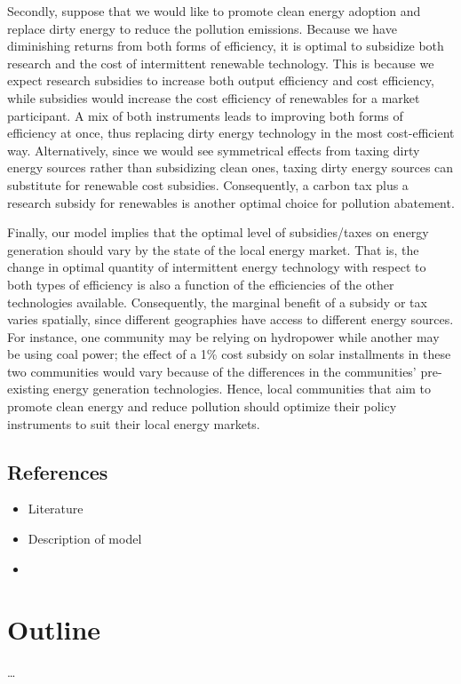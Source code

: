 \documentclass[11pt,a4paper]{extarticle}
\begin{document}
Secondly, suppose that we would like to promote clean energy adoption and replace dirty energy to reduce the pollution emissions. Because we have diminishing returns from both forms of efficiency, it is optimal to subsidize both research and the cost of intermittent renewable technology. This is because we expect research subsidies to increase both output efficiency and cost efficiency, while subsidies would increase the cost efficiency of renewables for a market participant. A mix of both instruments leads to improving both forms of efficiency at once, thus replacing dirty energy technology in the most cost-efficient way. Alternatively, since we would see symmetrical effects from taxing dirty energy sources rather than subsidizing clean ones, taxing dirty energy sources can substitute for renewable cost subsidies. Consequently, a carbon tax plus a research subsidy for renewables is another optimal choice for pollution abatement. 

Finally, our model implies that the optimal level of subsidies/taxes on energy generation should vary by the state of the local energy market. That is, the change in optimal quantity of intermittent energy technology with respect to both types of efficiency is also a function of the efficiencies of the other technologies available. Consequently, the marginal benefit of a subsidy or tax varies spatially, since different geographies have access to different energy sources. For instance, one community may be relying on hydropower while another may be using coal power; the effect of a 1\% cost subsidy on solar installments in these two communities would vary because of the differences in the communities’ pre-existing energy generation technologies. Hence, local communities that aim to promote clean energy and reduce pollution should optimize their policy instruments to suit their local energy markets. 

 
\subsection{References}

\begin{itemize}
	\item Literature
	\item Description of model
	\item 
\end{itemize}



\section{Outline}
\dots
\end{document}
